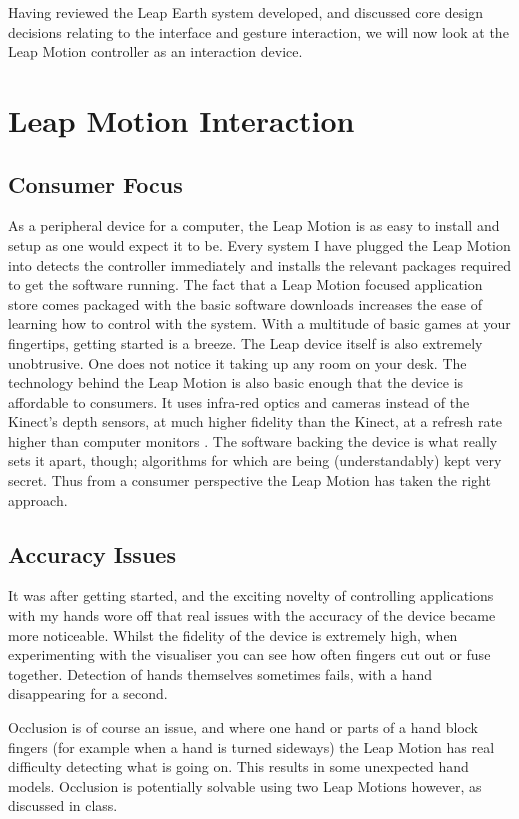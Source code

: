 \documentclass{sigplanconf}
\begin{document}
Having reviewed the Leap Earth system developed, and discussed core design decisions relating to the interface and gesture interaction, we will now look at the Leap Motion controller as an interaction device.


\section{Leap Motion Interaction} 
\label{sec:leap_interaction}

\subsection{Consumer Focus}

As a peripheral device for a computer, the Leap Motion is as easy to install and setup as one would expect it to be. Every system I have plugged the Leap Motion into detects the controller immediately and installs the relevant packages required to get the software running. The fact that a Leap Motion focused application store comes packaged with the basic software downloads increases the ease of learning how to control with the system. With a multitude of basic games at your fingertips, getting started is a breeze. The Leap device itself is also extremely unobtrusive. One does not notice it taking up any room on your desk. The technology behind the Leap Motion is also basic enough that the device is affordable to consumers. It uses infra-red optics and cameras instead of the Kinect's depth sensors, at much higher fidelity than the Kinect, at a refresh rate higher than computer monitors \cite{}. The software backing the device is what really sets it apart, though; algorithms for which are being (understandably) kept very secret. Thus from a consumer perspective the Leap Motion has taken the right approach. 

\subsection{Accuracy Issues}

It was after getting started, and the exciting novelty of controlling applications with my hands wore off that real issues with the accuracy of the device became more noticeable. Whilst the fidelity of the device is extremely high, when experimenting with the visualiser you can see how often fingers cut out or fuse together. Detection of hands themselves sometimes fails, with a hand disappearing for a second. 

Occlusion is of course an issue, and where one hand or parts of a hand block fingers (for example when a hand is turned sideways) the Leap Motion has real difficulty detecting what is going on. This results in some unexpected hand models. Occlusion is potentially solvable using two Leap Motions however, as discussed in class.
\end{document}
